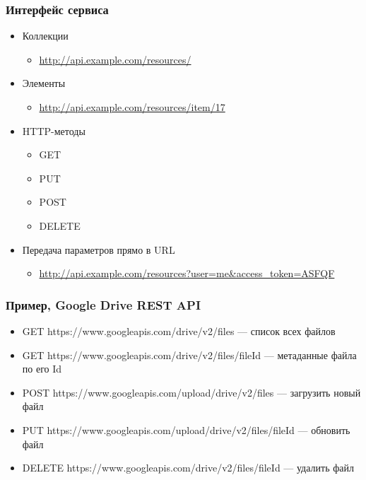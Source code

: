 \documentclass[xetex,mathserif,serif]{beamer}
\begin{document}
    \begin{frame}
        \frametitle{Интерфейс сервиса}
        \begin{itemize}
            \item Коллекции
            \begin{itemize}
                \item \url{http://api.example.com/resources/}
            \end{itemize}
            \item Элементы
            \begin{itemize}
                \item \url{http://api.example.com/resources/item/17}
            \end{itemize}
            \item HTTP-методы
            \begin{itemize}
                \item GET
                \item PUT
                \item POST
                \item DELETE
            \end{itemize}
            \item Передача параметров прямо в URL
            \begin{itemize}
                \item \url{http://api.example.com/resources?user=me&access_token=ASFQF}
            \end{itemize}
        \end{itemize}
    \end{frame}

    \begin{frame}
        \frametitle{Пример, Google Drive REST API}
        \begin{itemize}
            \item GET https://www.googleapis.com/drive/v2/files --- список всех файлов
            \item GET https://www.googleapis.com/drive/v2/files/fileId --- метаданные файла по его Id
            \item POST https://www.googleapis.com/upload/drive/v2/files — загрузить новый файл
            \item PUT https://www.googleapis.com/upload/drive/v2/files/fileId --- обновить файл
            \item DELETE https://www.googleapis.com/drive/v2/files/fileId --- удалить файл
        \end{itemize}
    \end{frame}
\end{document}
